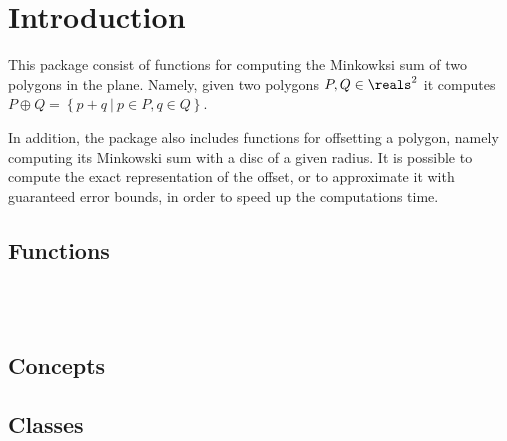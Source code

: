 \section*{Introduction}
\label{mink_ref_sec:intro}

This package consist of functions for computing the Minkowksi sum
of two polygons in the plane. Namely, given two polygons $P,Q \in
\reals^2$ it computes $P \oplus Q = \left\{ p + q ~\vert~ p \in P,
q \in Q \right\}$.

In addition, the package also includes functions for offsetting a
polygon, namely computing its Minkowski sum with a disc of a given
radius. It is possible to compute the exact representation of the
offset, or to approximate it with guaranteed error bounds, in order
to speed up the computations time.

\subsection*{Functions}

\\
\\

\subsection*{Concepts}


\subsection*{Classes}

\\
\\
\\
\\


